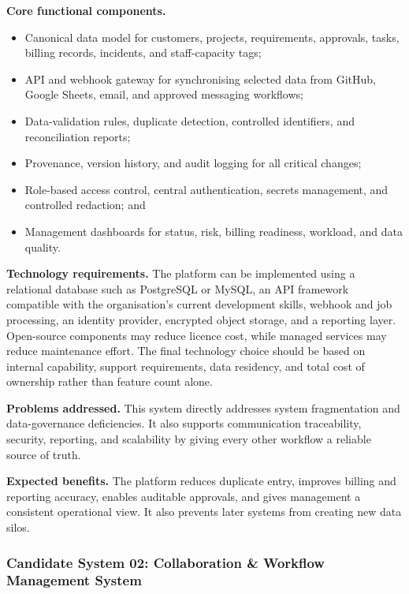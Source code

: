 \documentclass[12pt,a4paper]{report}
\begin{document}
\textbf{Core functional components.}
\begin{itemize}[leftmargin=1.6em]
    \item Canonical data model for customers, projects, requirements, approvals, tasks,
          billing records, incidents, and staff-capacity tags;
    \item API and webhook gateway for synchronising selected data from GitHub, Google Sheets,
          email, and approved messaging workflows;
    \item Data-validation rules, duplicate detection, controlled identifiers, and reconciliation
          reports;
    \item Provenance, version history, and audit logging for all critical changes;
    \item Role-based access control, central authentication, secrets management, and controlled
          redaction; and
    \item Management dashboards for status, risk, billing readiness, workload, and data quality.
\end{itemize}

\textbf{Technology requirements.}
The platform can be implemented using a relational database such as PostgreSQL or MySQL, an
API framework compatible with the organisation's current development skills, webhook and job
processing, an identity provider, encrypted object storage, and a reporting layer. Open-source
components may reduce licence cost, while managed services may reduce maintenance effort.
The final technology choice should be based on internal capability, support requirements, data
residency, and total cost of ownership rather than feature count alone.

\textbf{Problems addressed.}
This system directly addresses system fragmentation and data-governance deficiencies. It also
supports communication traceability, security, reporting, and scalability by giving every other
workflow a reliable source of truth.

\textbf{Expected benefits.}
The platform reduces duplicate entry, improves billing and reporting accuracy, enables auditable
approvals, and gives management a consistent operational view. It also prevents later systems
from creating new data silos.

\subsubsection{Candidate System 02: Collaboration \& Workflow Management System}\label{sec:candidate-workflow}
\end{document}
